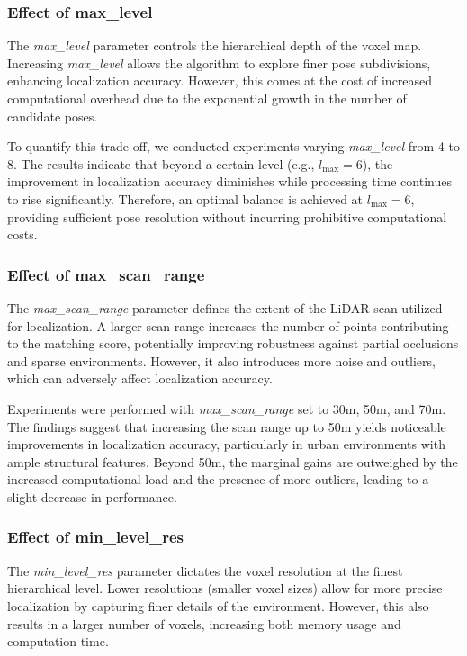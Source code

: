 \subsubsection{Effect of max\_level}
The \textit{max\_level} parameter controls the hierarchical depth of the voxel map. Increasing \textit{max\_level} allows the algorithm to explore finer pose subdivisions, enhancing localization accuracy. However, this comes at the cost of increased computational overhead due to the exponential growth in the number of candidate poses.

To quantify this trade-off, we conducted experiments varying \textit{max\_level} from 4 to 8. The results indicate that beyond a certain level (e.g., $l_{\text{max}} = 6$), the improvement in localization accuracy diminishes while processing time continues to rise significantly. Therefore, an optimal balance is achieved at $l_{\text{max}} = 6$, providing sufficient pose resolution without incurring prohibitive computational costs.

\subsubsection{Effect of max\_scan\_range}
The \textit{max\_scan\_range} parameter defines the extent of the LiDAR scan utilized for localization. A larger scan range increases the number of points contributing to the matching score, potentially improving robustness against partial occlusions and sparse environments. However, it also introduces more noise and outliers, which can adversely affect localization accuracy.

Experiments were performed with \textit{max\_scan\_range} set to 30m, 50m, and 70m. The findings suggest that increasing the scan range up to 50m yields noticeable improvements in localization accuracy, particularly in urban environments with ample structural features. Beyond 50m, the marginal gains are outweighed by the increased computational load and the presence of more outliers, leading to a slight decrease in performance.

\subsubsection{Effect of min\_level\_res}
The \textit{min\_level\_res} parameter dictates the voxel resolution at the finest hierarchical level. Lower resolutions (smaller voxel sizes) allow for more precise localization by capturing finer details of the environment. However, this also results in a larger number of voxels, increasing both memory usage and computation time.

